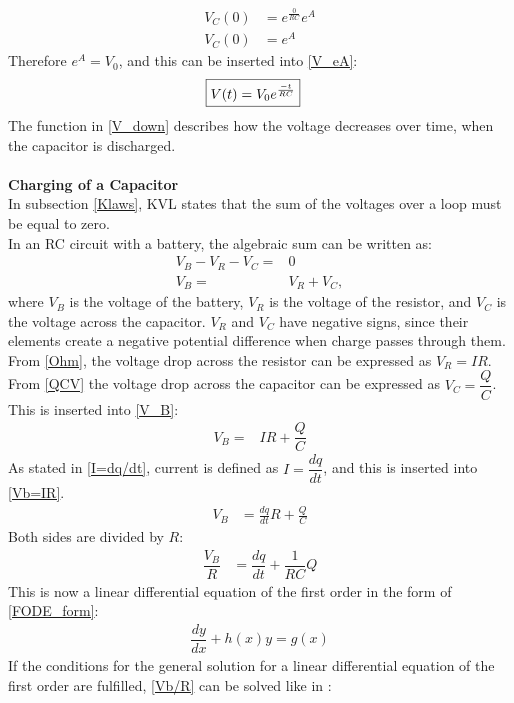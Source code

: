  \begin{align*}
	V_C(0) &= e^{\frac{0}{RC}}e^A\\
	V_C(0) &= e^A
 \end{align*}
Therefore $e^A = V_0$, and this can be inserted into \eqref{V_eA}:
\begin{align}
\label{V_down}
\Aboxed{
 V(t) = V_0e^{\frac{-t}{RC}}
 }
\end{align}
The function in \eqref{V_down} describes how the voltage decreases over time, when the capacitor is discharged.
\\
\\
\textbf{Charging of a Capacitor}\\
In subsection \ref{Klaws}, KVL states that the sum of the voltages over a loop must be equal to zero. 
\\
In an RC circuit with a battery, the algebraic sum can be written as:
\begin{align}
V_B-V_R-V_C =& 0 \nonumber \\
V_B=&V_R+V_C, \label{V_B}
\end{align}
where $V_B$ is the voltage of the battery, $V_R$ is the voltage of the resistor, and $V_C$ is the voltage across the capacitor. $V_R$ and $V_C$ have negative signs, since their elements create a negative potential difference when charge passes through them.
\\
From \eqref{Ohm}, the voltage drop across the resistor can be expressed as $V_R=IR$. From \eqref{QCV} the voltage drop across the capacitor can be expressed as $V_C=\dfrac{Q}{C}$. This is inserted into \eqref{V_B}:
\begin{align}
V_B =& IR+\dfrac{Q}{C} \label{Vb=IR}
\end{align}
As stated in \eqref{I=dq/dt}, current is defined as $I =\dfrac{dq}{dt}$, and this is inserted into \eqref{Vb=IR}.
 \begin{align*}
 	V_B &= \frac{dq}{dt} R + \frac{Q}{C}
 \end{align*}
Both sides are divided by $R$:
\begin{align}
\dfrac{V_B}{R} &= \dfrac{dq}{dt} + \dfrac{1}{RC}Q\label{Vb/R} 
\end{align}
This is now a linear differential equation of the first order in the form of \eqref{FODE_form}:
\begin{align*}
\dfrac{dy}{dx}+h(x)y=g(x)
\end{align*}
If the conditions for the general solution for a linear differential equation of the first order are fulfilled, \eqref{Vb/R} can be solved like in :
